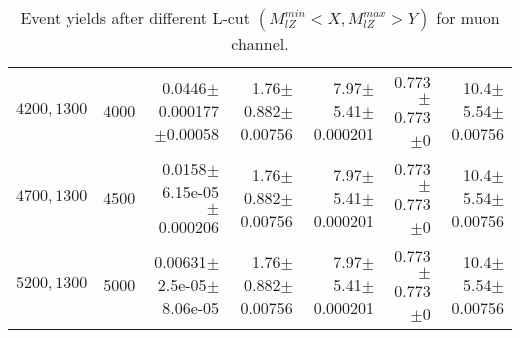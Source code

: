 \documentclass[]{article}
\begin{document}
\begin{table}
\begin{center}
{\begin{tabular}{ |r|r|r|r|r|r|r|}
$4200,1300$ & 4000 & 0.0446$\pm$0.000177$\pm$0.00058 & 1.76$\pm$0.882$\pm$0.00756 & 7.97$\pm$5.41$\pm$0.000201 & 0.773$\pm$0.773$\pm$0 & 10.4$\pm$5.54$\pm$0.00756 \\
$4700,1300$ & 4500 & 0.0158$\pm$6.15e-05$\pm$0.000206 & 1.76$\pm$0.882$\pm$0.00756 & 7.97$\pm$5.41$\pm$0.000201 & 0.773$\pm$0.773$\pm$0 & 10.4$\pm$5.54$\pm$0.00756 \\
$5200,1300$ & 5000 & 0.00631$\pm$2.5e-05$\pm$8.06e-05 & 1.76$\pm$0.882$\pm$0.00756 & 7.97$\pm$5.41$\pm$0.000201 & 0.773$\pm$0.773$\pm$0 & 10.4$\pm$5.54$\pm$0.00756 \\
\hline 
\end{tabular}
}
\end{center}
\caption{Event yields after different L-cut $(M_{lZ}^{min} < X, M_{lZ}^{max} > Y)$ for muon channel.}
\end{table}
\end{document}
